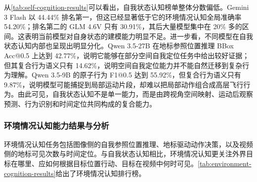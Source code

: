 从\autoref{tab:self-cognition-results}可以看出，自我状态认知榜单整体分数偏低。Gemini 3 Flash 以 44.44\% 排名第一，但这已经显著低于它的环境情况认知全局准确率 54.20\%；排名第二的 GLM 4.6V 只有 30.91\%，其后大量模型集中在 20\% 多的区间。这表明当前模型对自身状态的建模能力明显不足。进一步看，不同模型在自我状态认知内部也呈现出明显分化。Qwen 3.5-27B 在地标参照位置推理 BBox Acc@0.5 上达到 42.77\%，说明它能够在部分空间自我定位任务中给出较好证据；但其复合行为语义只有 14.62\%，说明空间自我定位能力并不能自然迁移到复杂行为理解。Qwen 3.5-9B 的原子行为 F1@0.5 达到 55.92\%，但复合行为语义只有 9.87\%，说明模型可能捕捉到局部运动片段，却难以把局部动作组合成高层飞行行为。由此可见，自我状态认知不是单一能力，而是由跨视角空间映射、运动后观察预测、行为识别和时间定位共同构成的复合能力。

\subsubsection{环境情况认知能力结果与分析}

环境情况认知任务包括图像侧的自我参照位置推理、地标驱动动作决策，以及视频侧的地标可见次数与时间定位。与自我状态认知相比，环境情况认知更关注外界目标在哪里、应如何根据目标位置行动、目标在视频中何时可见。\autoref{tab:environment-cognition-results}给出了环境情况认知排行榜。

